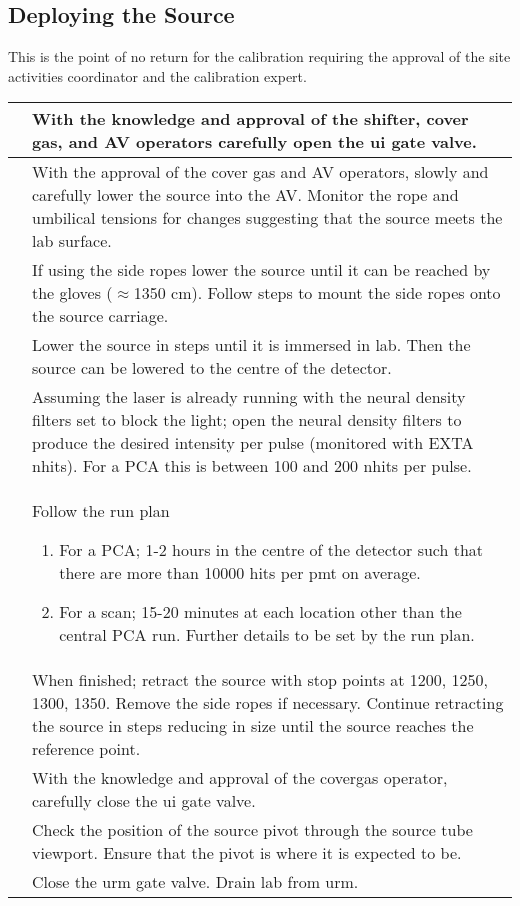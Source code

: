 \subsection{Deploying the Source}
This is the point of no return for the calibration requiring the approval of the site activities coordinator and the calibration expert. 
\begin{tabular}{|c|p{4cm}|}
& With the knowledge and approval of the shifter, cover gas, and AV operators carefully open the ui gate valve. \\ \hline
& With the approval of the cover gas and AV operators, slowly and carefully lower the source into the AV. Monitor the rope and umbilical tensions for changes suggesting that the source meets the lab surface.\\ \hline
& If using the side ropes lower the source until  it can be reached by the gloves ($\approx$1350 cm). Follow steps to mount the side ropes onto the source carriage. \\ \hline
&  Lower the source in steps until it is immersed in lab. Then the source can be lowered to the centre of the detector. \\ \hline
& Assuming the laser is already running with the neural density filters set to block the light; open the neural density filters to produce the desired intensity per pulse (monitored with EXTA nhits). For a PCA this is between 100 and 200 nhits per pulse. \\ \hline
& Follow the run plan
  \begin{enumerate}
	\item For a PCA; 1-2 hours in the centre of the detector such that there are more than 10000 hits per pmt on average. 
	\item For a scan; 15-20 minutes at each location other than the central PCA run. Further details to be set by the run plan. 
  \end{enumerate} \\ \hline
& When finished; retract the source  with stop points at 1200, 1250, 1300, 1350. Remove the side ropes if necessary. Continue retracting the source in steps reducing in size until the source reaches the reference point. \\ \hline
& With the knowledge and approval of the covergas operator, carefully close the ui gate valve. \\ \hline
& Check the position of the source pivot through the source tube viewport. Ensure that the pivot is where it is expected to be. \\ \hline
& Close the urm gate valve. Drain lab from urm. \\ \hline
\end{tabular}

